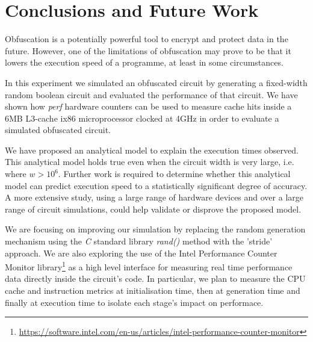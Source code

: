 \section{Conclusions and Future Work}
Obfuscation is a potentially powerful tool to encrypt and protect data in the future. However, one of the limitations of obfuscation may prove to be that it lowers the execution speed of a programme, at least in some circumstances.
\par
In this experiment we simulated an obfuscated circuit by generating a fixed-width random boolean circuit and evaluated the performance of that circuit. We have shown how \textit{perf} hardware counters can be used to measure cache hits inside a 6MB L3-cache ix86 microprocessor clocked at 4GHz in order to evaluate a simulated obfuscated circuit.
\par
We have proposed an analytical model to explain the execution times observed. This analytical model holds true even when the circuit width is very large, i.e. where $w > 10^6$. Further work is required to determine whether this analytical model can predict execution speed to a statistically significant degree of accuracy. A more extensive study, using a large range of hardware devices and over a large range of circuit simulations, could help validate or disprove the proposed model.
\par
We are focusing on improving our simulation by replacing the random generation mechanism using the \textit{C} standard library \textit{rand()} method with the ’stride’ approach\cite{stride}. We are also exploring the use of the Intel Performance Counter Monitor library\footnote{\url{https://software.intel.com/en-us/articles/intel-performance-counter-monitor}} as a high level interface for measuring real time performance data directly inside the circuit's code. In particular, we plan to measure the CPU cache and instruction metrics at initialisation time, then at generation time and finally at execution time to isolate each stage's impact on performace. 

